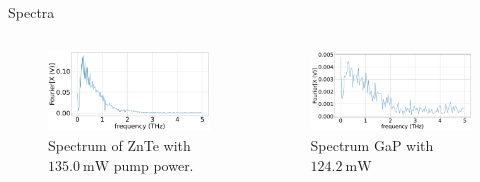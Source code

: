 \documentclass[aspectratio=1610, 9pt]{beamer}
\begin{document}
\begin{frame}{Spectra}
  \begin{columns}
    \begin{column}{.5\textwidth}
  \begin{figure}
    \includegraphics[width=\textwidth]{images/2_11_30_20normalFX.pdf}
    \caption{Spectrum of ZnTe with $\SI{135.0}{\milli\W}$ pump power.}
  \end{figure}
  \end{column}
  \begin{column}{.5\textwidth}
    \begin{figure}
      \includegraphics[width=\textwidth]{images/GaP14_55_42normalFX.pdf}
      \caption{Spectrum GaP with $\SI{124.2}{\milli\W }$}
    \end{figure}    
  \end{column}
  \end{columns}
\end{frame}
\end{document}
